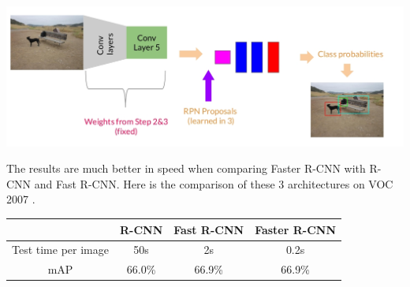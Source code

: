 \documentclass{article}
\begin{document}
\begin{enumerate}
	\begin{center}
		\includegraphics[scale=0.3]{faster_rcnn_step_4}
	\end{center}
\end{enumerate}

The results are much better in speed when comparing Faster R-CNN with R-CNN and Fast R-CNN. Here is the comparison of these 3 architectures on VOC 2007 \cite{videos/faster-rcnn}.
\begin{center}
	\begin{tabular}{| c | c | c | c |}
		\hline
		 & \textbf{R-CNN} & \textbf{Fast R-CNN}	& \textbf{Faster R-CNN} \\
		\hline
		Test time per image & 50s & 2s & 0.2s \\
		mAP & 66.0\% & 66.9\% & 66.9\%  \\
		\hline
	\end{tabular}
\end{center}

\clearpage
\printbibliography[title={References}]
\end{document}
